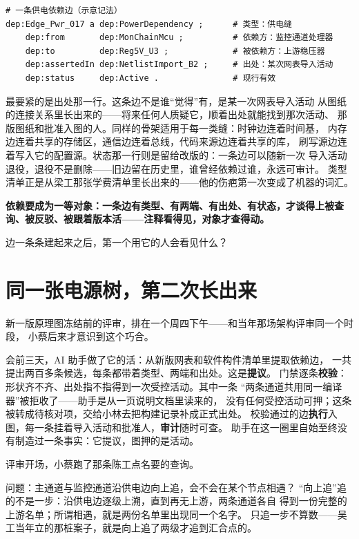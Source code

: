 \nopagebreak[4]
\begin{codebox}
\begin{Verbatim}[fontsize=\small,breaklines=true,breakanywhere=true,breaksymbolleft={},breaksymbolright={}]
# 一条供电依赖边（示意记法）
dep:Edge_Pwr_017 a dep:PowerDependency ;      # 类型：供电缝
    dep:from       dep:MonChainMcu ;          # 依赖方：监控通道处理器
    dep:to         dep:Reg5V_U3 ;             # 被依赖方：上游稳压器
    dep:assertedIn dep:NetlistImport_B2 ;     # 出处：某次网表导入活动
    dep:status     dep:Active .               # 现行有效
\end{Verbatim}
\end{codebox}

最要紧的是出处那一行。这条边不是谁“觉得”有，是某一次网表导入活动
从图纸的连接关系里长出来的——将来任何人质疑它，顺着出处就能找到那次活动、
那版图纸和批准入图的人。同样的骨架适用于每一类缝：时钟边连着时间基，
内存边连着共享的存储区，通信边连着总线，代码来源边连着共享的库，
刷写源边连着写入它的配置源。状态那一行则是留给改版的：一条边可以随新一次
导入活动退役，退役不是删除——旧边留在历史里，谁曾经依赖过谁，永远可审计。
类型清单正是从梁工那张学费清单里长出来的——他的伤疤第一次变成了机器的词汇。

\textbf{依赖要成为一等对象：一条边有类型、有两端、有出处、有状态，才谈得上被查询、被反驳、被跟着版本活——注释看得见，对象才查得动。}

边一条条建起来之后，第一个用它的人会看见什么？

\section{同一张电源树，第二次长出来}

新一版原理图冻结前的评审，排在一个周四下午——和当年那场架构评审同一个时段，
小蔡后来才意识到这个巧合。

会前三天，AI 助手做了它的活：从新版网表和软件构件清单里提取依赖边，
一共提出两百多条候选，每条都带着类型、两端和出处。这是\textbf{提议}。
门禁逐条\textbf{校验}：形状齐不齐、出处指不指得到一次受控活动。其中一条
“两条通道共用同一编译器”被拒收了——助手是从一页说明文档里读来的，
没有任何受控活动可押；这条被转成待核对项，交给小林去把构建记录补成正式出处。
校验通过的边\textbf{执行}入图，每一条挂着导入活动和批准人，\textbf{审计}随时可查。
助手在这一圈里自始至终没有制造过一条事实：它提议，图押的是活动。

评审开场，小蔡跑了那条陈工点名要的查询。

问题：主通道与监控通道沿供电边向上追，会不会在某个节点相遇？
“向上追”追的不是一步：沿供电边逐级上溯，直到再无上游，两条通道各自
得到一份完整的上游名单；所谓相遇，就是两份名单里出现同一个名字。
只追一步不算数——吴工当年立的那桩案子，就是向上追了两级才追到汇合点的。

